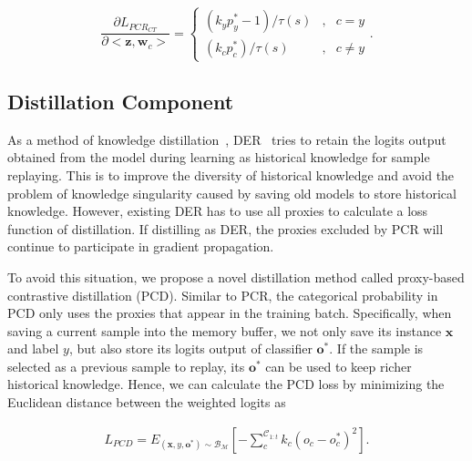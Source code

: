 \begin{equation}
    \label{eq:gradient_pcr++}
    \frac{\partial L_{PCR_{CT}}}{\partial <\bm{z},\bm{w}_c>}=\left\{
    \begin{aligned}
        (k_yp^*_y-1)/\tau(s)&,&c= y \\
        (k_cp^*_c)/\tau(s)&,&c\neq y
    \end{aligned}
    \right..
\end{equation}


\subsection{Distillation Component}
As a method of knowledge distillation~\cite{hinton2015distilling}, DER~\cite{buzzega2020dark} tries to retain the logits output obtained from the model during learning as historical knowledge for sample replaying. This is to improve the diversity of historical knowledge and avoid the problem of knowledge singularity caused by saving old models to store historical knowledge. However, existing DER has to use all proxies to calculate a loss function of distillation. If distilling as DER, the proxies excluded by PCR will continue to participate in gradient propagation. 

To avoid this situation, we propose a novel distillation method called proxy-based contrastive distillation (PCD). Similar to PCR, the categorical probability in PCD only uses the proxies that appear in the training batch. Specifically, when saving a current sample into the memory buffer, we not only save its instance $\bm{x}$ and label $y$, but also store its logits output of classifier $\bm{o}^*$. If the sample is selected as a previous sample to replay, its $\bm{o}^*$ can be used to keep richer historical knowledge. Hence, we can calculate the PCD loss by minimizing the Euclidean distance between the weighted logits as

\begin{equation}
\label{eq:pcd}
\begin{split}
    L_{PCD}=E_{(\bm{x},y,\bm{o}^*)\sim{\mathcal{B}_\mathcal{M}}}[-\sum_{c}^{\mathcal{C}_{1:t}}k_c(o_c-o^*_c)^2].
\end{split}
\end{equation}

